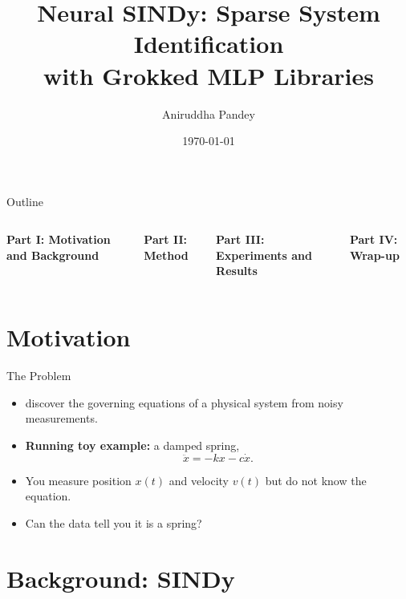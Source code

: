 \documentclass[
11pt,notheorems,hyperref={pdfauthor=Aniruddha Pandey}
]{beamer}
\title[Neural SINDy]{Neural SINDy: Sparse System Identification\\with Grokked MLP Libraries}
\author[Aniruddha Pandey]{Aniruddha Pandey}
\institute{
    Department of Computer Science\\
    Stevens Institute of Technology
}
\date{\today}
\begin{document}
{
\begin{frame}
  \titlepage
\end{frame}
}
\addtocounter{framenumber}{-1}

\begin{frame}{Outline}{}
    \footnotesize
    \begin{columns}[T,onlytextwidth]
            \textbf{Part I: Motivation and Background}\par\smallskip
            \tableofcontents[part=1,hideallsubsections]
            \medskip
            \textbf{Part II: Method}\par\smallskip
            \tableofcontents[part=2,hideallsubsections]
        \hspace{0.04\textwidth}
            \textbf{Part III: Experiments and Results}\par\smallskip
            \tableofcontents[part=3,hideallsubsections]
            \medskip
            \textbf{Part IV: Wrap-up}\par\smallskip
            \tableofcontents[part=4,hideallsubsections]
    \end{columns}
\end{frame}


\section{Motivation}

\begin{frame}{The Problem}
\begin{itemize}
    \item {} discover the governing equations of a physical system from noisy measurements.
    \item \textbf{Running toy example:} a damped spring,
    \begin{equation*}
        \ddot{x} = -k x - c \dot{x}.
    \end{equation*}
    \item You measure position $x(t)$ and velocity $v(t)$ but \alert{do not know} the equation.
    \item Can the data tell you it is a spring?
\end{itemize}
\end{frame}

\section{Background: SINDy}
\end{document}
